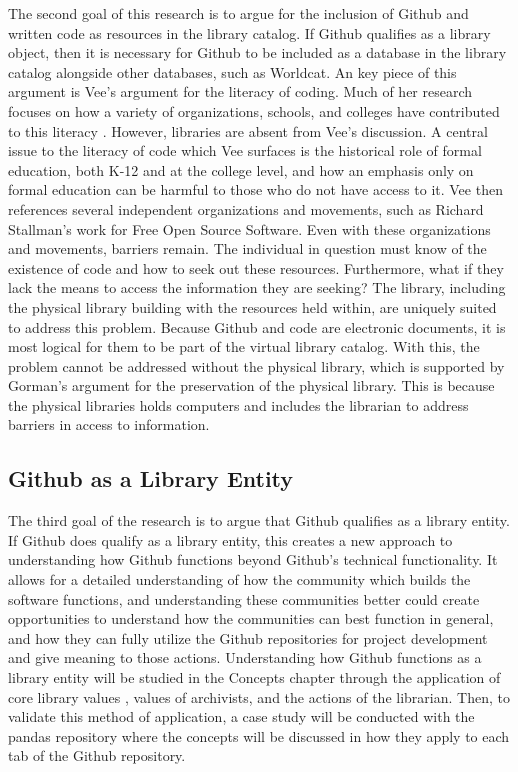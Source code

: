 The second goal of this research is to argue for the inclusion of Github and written code as resources in the library catalog. If Github qualifies as a library object, then it is necessary for Github to be included as a database in the library catalog alongside other databases, such as Worldcat. An key piece of this argument is Vee's argument for the literacy of coding. Much of her research focuses on how a variety of organizations, schools, and colleges have contributed to this literacy \cite{vee2017coding}. However, libraries are absent from Vee's discussion. A central issue to the literacy of code which Vee surfaces is the historical role of formal education, both K-12 and at the college level, and how an emphasis only on formal education can be harmful to those who do not have access to it. Vee then references several independent organizations and movements, such as Richard Stallman's work for Free Open Source Software\cite{vee2017coding}. Even with these organizations and movements, barriers remain. The individual in question must know of the existence of code and how to seek out these resources. Furthermore, what if they lack the means to access the information they are seeking? The library, including the physical library building with the resources held within, are uniquely suited to address this problem. Because Github and code are electronic documents, it is most logical for them to be part of the virtual library catalog. With this, the problem cannot be addressed without the physical library, which is supported by Gorman's argument for the preservation of the physical library. This is because the physical libraries holds computers and includes the librarian to address barriers in access to information. 

\subsection{Github as a Library Entity}

The third goal of the research is to argue that Github qualifies as a library entity. If Github does qualify as a library entity, this creates a new approach to understanding how Github functions beyond Github's technical functionality. It allows for a detailed understanding of how the community which builds the software functions, and understanding these communities better could create opportunities to understand how the communities can best function in general, and how they can fully utilize the Github repositories for project development and give meaning to those actions. Understanding how Github functions as a library entity will be studied in the Concepts chapter through the application of core library values\cite{gorman2000values} \cite{rubin2016foundationslis}, values of archivists\cite{rubin2016foundationslis}, and the actions of the librarian\cite{gorman2000values}. Then, to validate this method of application, a case study will be conducted with the pandas repository where the concepts will be discussed in how they apply to each tab of the Github repository. 


